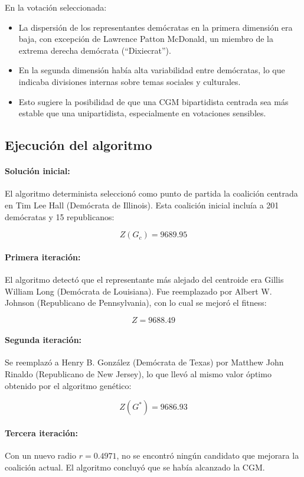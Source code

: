 \documentclass[12pt]{article}
\begin{document}
En la votación seleccionada:
\begin{itemize}
    \item La dispersión de los representantes demócratas en la primera dimensión era baja, con excepción de Lawrence Patton McDonald, un miembro de la extrema derecha demócrata (``Dixiecrat'').
    \item En la segunda dimensión había alta variabilidad entre demócratas, lo que indicaba divisiones internas sobre temas sociales y culturales.
    \item Esto sugiere la posibilidad de que una CGM bipartidista centrada sea más estable que una unipartidista, especialmente en votaciones sensibles.
\end{itemize}

\subsection*{Ejecución del algoritmo}

\paragraph{Solución inicial:}
El algoritmo determinista seleccionó como punto de partida la coalición centrada en Tim Lee Hall (Demócrata de Illinois). Esta coalición inicial incluía a 201 demócratas y 15 republicanos:

\[
Z(G_c) = 9689.95
\]

\paragraph{Primera iteración:}
El algoritmo detectó que el representante más alejado del centroide era Gillis William Long (Demócrata de Louisiana). Fue reemplazado por Albert W. Johnson (Republicano de Pennsylvania), con lo cual se mejoró el fitness:

\[
Z = 9688.49
\]

\paragraph{Segunda iteración:}
Se reemplazó a Henry B. González (Demócrata de Texas) por Matthew John Rinaldo (Republicano de New Jersey), lo que llevó al mismo valor óptimo obtenido por el algoritmo genético:

\[
Z(G^*) = 9686.93
\]

\paragraph{Tercera iteración:}
Con un nuevo radio \( r = 0.4971 \), no se encontró ningún candidato que mejorara la coalición actual. El algoritmo concluyó que se había alcanzado la CGM.
\end{document}
